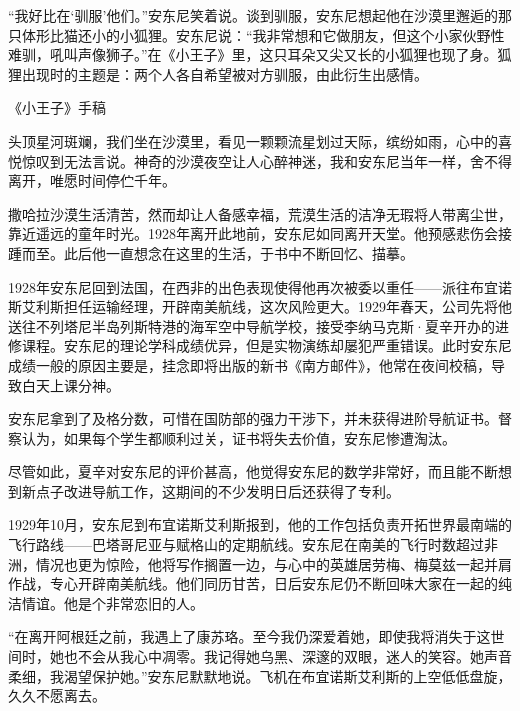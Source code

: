 “我好比在‘驯服'他们。”安东尼笑着说。谈到驯服，安东尼想起他在沙漠里邂逅的那只体形比猫还小的小狐狸。安东尼说：“我非常想和它做朋友，但这个小家伙野性难驯，吼叫声像狮子。”在《小王子》里，这只耳朵又尖又长的小狐狸也现了身。狐狸出现时的主题是：两个人各自希望被对方驯服，由此衍生出感情。

{\startalignment[center]
 \stopalignment}
《小王子》手稿

头顶星河斑斓，我们坐在沙漠里，看见一颗颗流星划过天际，缤纷如雨，心中的喜悦惊叹到无法言说。神奇的沙漠夜空让人心醉神迷，我和安东尼当年一样，舍不得离开，唯愿时间停伫千年。

撒哈拉沙漠生活清苦，然而却让人备感幸福，荒漠生活的洁净无瑕将人带离尘世，靠近遥远的童年时光。1928年离开此地前，安东尼如同离开天堂。他预感悲伤会接踵而至。此后他一直想念在这里的生活，于书中不断回忆、描摹。

{\startalignment[center]
 \stopalignment}


\stoptitle

\starttitle[title={10}]

1928年安东尼回到法国，在西非的出色表现使得他再次被委以重任------派往布宜诺斯艾利斯担任运输经理，开辟南美航线，这次风险更大。1929年春天，公司先将他送往不列塔尼半岛列斯特港的海军空中导航学校，接受李纳马克斯·夏辛开办的进修课程。安东尼的理论学科成绩优异，但是实物演练却屡犯严重错误。此时安东尼成绩一般的原因主要是，挂念即将出版的新书《南方邮件》，他常在夜间校稿，导致白天上课分神。

安东尼拿到了及格分数，可惜在国防部的强力干涉下，并未获得进阶导航证书。督察认为，如果每个学生都顺利过关，证书将失去价值，安东尼惨遭淘汰。

尽管如此，夏辛对安东尼的评价甚高，他觉得安东尼的数学非常好，而且能不断想到新点子改进导航工作，这期间的不少发明日后还获得了专利。

1929年10月，安东尼到布宜诺斯艾利斯报到，他的工作包括负责开拓世界最南端的飞行路线------巴塔哥尼亚与赋格山的定期航线。安东尼在南美的飞行时数超过非洲，情况也更为惊险，他将写作搁置一边，与心中的英雄居劳梅、梅莫兹一起并肩作战，专心开辟南美航线。他们同历甘苦，日后安东尼仍不断回味大家在一起的纯洁情谊。他是个非常恋旧的人。

“在离开阿根廷之前，我遇上了康苏珞。至今我仍深爱着她，即使我将消失于这世间时，她也不会从我心中凋零。我记得她乌黑、深邃的双眼，迷人的笑容。她声音柔细，我渴望保护她。”安东尼默默地说。飞机在布宜诺斯艾利斯的上空低低盘旋，久久不愿离去。

